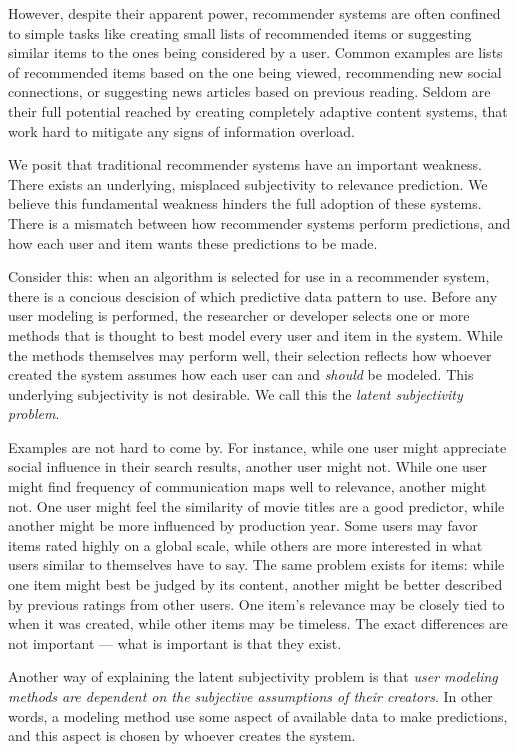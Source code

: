 However, despite their apparent power, recommender systems are often confined
to simple tasks like creating small lists of recommended items
or suggesting similar items to the ones being considered by a user.
Common examples are lists of recommended items based on the one being viewed, 
recommending new social connections, or suggesting news articles based on previous reading.
Seldom are their full potential reached by creating completely adaptive
content systems, that work hard to mitigate any signs of information overload.

We posit that traditional recommender systems have an important weakness.
There exists an underlying, misplaced subjectivity to relevance prediction.
We believe this fundamental weakness hinders the full adoption of these systems.
There is a mismatch between how recommender systems perform predictions,
and how each user and item wants these predictions to be made.



Consider this: 
when an algorithm is selected for use in a recommender system,
there is a concious descision of which predictive data pattern to use.
Before any user modeling is performed, the researcher or developer selects
one or more methods that is thought to best model every user and item in the system.
While the methods themselves may perform well, their selection
reflects how whoever created the system assumes how each user
can and \emph{should} be modeled. This underlying subjectivity is not desirable.
We call this the \emph{latent subjectivity problem}.

Examples are not hard to come by.
For instance, while one user might appreciate social
influence in their search results, another user might not.
While one user might find frequency of communication maps well to relevance,
another might not. 
One user might feel the similarity of movie titles are a good predictor,
while another might be more influenced by production year.
Some users may favor items rated highly on a global scale,
while others are more interested in what users similar to themselves have to say.
The same problem exists for items: while one item might best be judged by its content,
another might be better described by previous ratings from other users.
One item's relevance may be closely tied to when it was created,
while other items may be timeless.
The exact differences are not important --- what is important is that they exist.

Another way of explaining the latent subjectivity problem is that 
\emph{user modeling methods are dependent on the subjective assumptions of their creators}.
In other words, a modeling method use some aspect of available data to make predictions,
and this aspect is chosen by whoever creates the system.

